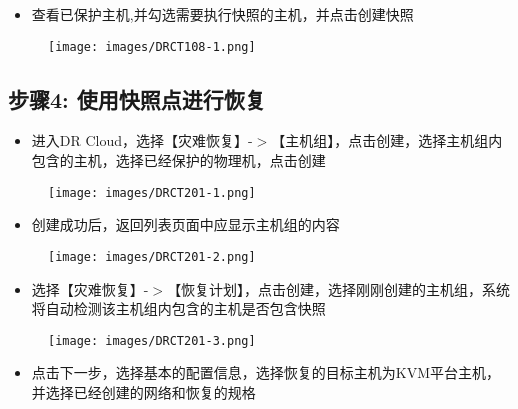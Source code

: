 \begin{itemize}
\item 查看已保护主机,并勾选需要执行快照的主机，并点击创建快照

\end{itemize}

\begin{figure}[htbp]
\centering
\texttt{[image: images/DRCT108-1.png]}
\end{figure}

\subsection{步骤4: 使用快照点进行恢复}
\label{步骤4:使用快照点进行恢复}

\begin{itemize}
\item 进入DR Cloud，选择【灾难恢复】-$>$【主机组】，点击创建，选择主机组内包含的主机，选择已经保护的物理机，点击创建

\end{itemize}

\begin{figure}[htbp]
\centering
\texttt{[image: images/DRCT201-1.png]}
\end{figure}

\begin{itemize}
\item 创建成功后，返回列表页面中应显示主机组的内容

\end{itemize}

\begin{figure}[htbp]
\centering
\texttt{[image: images/DRCT201-2.png]}
\end{figure}

\begin{itemize}
\item 选择【灾难恢复】-$>$【恢复计划】，点击创建，选择刚刚创建的主机组，系统将自动检测该主机组内包含的主机是否包含快照

\end{itemize}

\begin{figure}[htbp]
\centering
\texttt{[image: images/DRCT201-3.png]}
\end{figure}

\begin{itemize}
\item 点击下一步，选择基本的配置信息，选择恢复的目标主机为KVM平台主机，并选择已经创建的网络和恢复的规格

\end{itemize}

